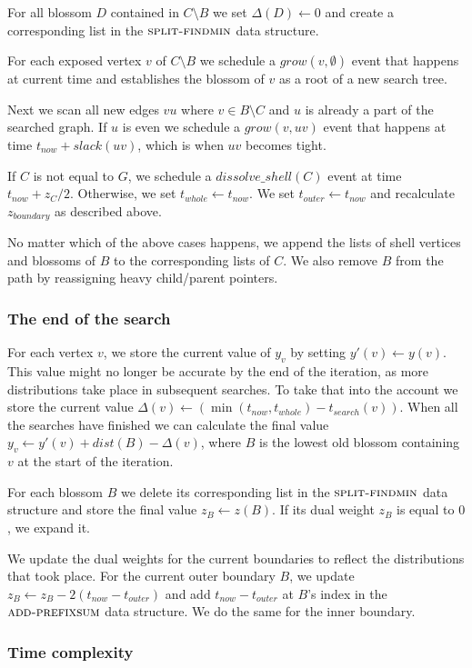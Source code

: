 For all blossom $D$ contained in $C \setminus B$ we set $\Delta(D) \gets 0$ and create a corresponding list in the $\textsc{split-findmin}$ data structure.

For each exposed vertex $v$ of $C \setminus B$ we schedule a $grow(v, \emptyset)$ event that happens at current time and establishes the blossom of $v$ as a root of a new search tree.

Next we scan all new edges $vu$ where $v \in B \setminus C$ and $u$ is already a part of the  searched graph. If $u$ is even we schedule a $grow(v, uv)$ event that happens at time $t_{now} + slack(uv)$, which is when $uv$ becomes tight. 

If $C$ is not equal to $G$, we schedule a $dissolve\_shell(C)$ event at time $t_{now} + z_C / 2$. Otherwise, we set $t_{whole} \gets t_{now}$. We set $t_{outer} \gets t_{now}$ and recalculate $z_{boundary}$ as described above.

No matter which of the above cases happens, we append the lists of shell vertices and blossoms of $B$ to the corresponding lists of $C$. We also remove $B$ from the path by reassigning heavy child/parent pointers.

\subsubsection*{The end of the search} 
For each vertex $v$, we store the current value of $y_v$ by setting $y'(v) \gets y(v)$. This value might no longer be accurate by the end of the iteration, as more distributions take place in subsequent searches. To take that into the account we store the current value $\Delta(v) \gets (\min(t_{now}, t_{whole}) - t_{search}(v))$. When all the searches have finished we can calculate the final value $y_v \gets y'(v) + dist(B) - \Delta(v)$, where $B$ is the lowest old blossom containing $v$ at the start of the iteration.

For each blossom $B$ we delete its corresponding list in the $\textsc{split-findmin}$ data structure and store the final value $z_B \gets z(B)$. If its dual weight $z_B$ is equal to $0$, we expand it.

We update the dual weights for the current boundaries to reflect the distributions that took place. For the current outer boundary $B$, we update $z_B \gets z_B - 2(t_{now} - t_{outer})$ and add $t_{now} - t_{outer}$ at $B$'s index in the $\textsc{add-prefixsum}$ data structure. We do the same for the inner boundary.

\subsubsection*{Time complexity} 


